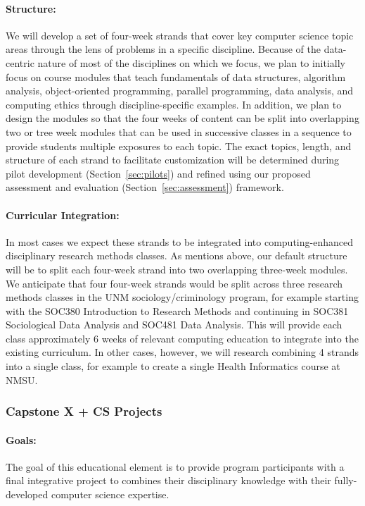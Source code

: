 \paragraph{Structure:} We will develop a set of four-week strands that cover key computer science topic areas through the lens of problems in a specific discipline. Because of the data-centric nature of most of the disciplines on which we focus, we plan to initially focus on course modules that teach fundamentals of data structures, algorithm analysis, object-oriented programming, parallel programming, data analysis, and computing ethics through discipline-specific examples. In addition, we plan to design the modules so that the four weeks of content can be split into overlapping two or tree week modules that can be used in successive classes in a sequence to provide students multiple exposures to each topic. The exact topics, length, and structure of each strand to facilitate customization will be determined during pilot development (Section~\ref{sec:pilots}) and refined using our proposed assessment and evaluation (Section~\ref{sec:assessment}) framework.

\paragraph{Curricular Integration:} In most cases we expect these strands to be integrated into computing-enhanced disciplinary research methods classes. As mentions above, our default structure will be to split each four-week strand into two overlapping three-week modules. We anticipate that four four-week strands would be split across three research methods classes in the UNM sociology/criminology program, for example starting with the SOC380 Introduction to Research Methods and continuing in SOC381 Sociological Data Analysis
 and SOC481 Data Analysis. This will provide each class approximately 6 weeks of relevant computing education to integrate into the existing curriculum. In other cases, however, we will research combining 4 strands into a single class, for example to create a single Health Informatics course at NMSU. 

\subsubsection{Capstone X + CS Projects}

\paragraph{Goals:} The goal of this educational element is to provide program participants with a final integrative project to combines their disciplinary knowledge with their fully-developed computer science expertise. 

